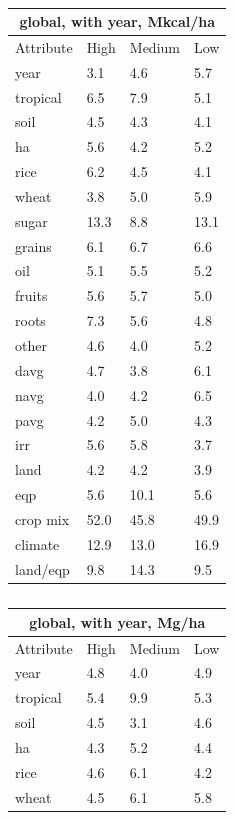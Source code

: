 \documentclass[11pt]{article}
\begin{document}
\begin{table}[h!]
\parbox{.45\linewidth} {
\centering
\begin{tabular}{llll}
\toprule
\multicolumn{4}{c}{\textbf{global, with year, Mkcal/ha}} \\
\midrule
Attribute & High & Medium & Low \\
\midrule
year & 3.1 & 4.6 & 5.7 \\
tropical & 6.5 & 7.9 & 5.1 \\
soil & 4.5 & 4.3 & 4.1 \\
ha & 5.6 & 4.2 & 5.2 \\
rice & 6.2 & 4.5 & 4.1 \\
wheat & 3.8 & 5.0 & 5.9 \\
sugar & 13.3 & 8.8 & 13.1 \\
grains & 6.1 & 6.7 & 6.6 \\
oil & 5.1 & 5.5 & 5.2 \\
fruits & 5.6 & 5.7 & 5.0 \\
roots & 7.3 & 5.6 & 4.8 \\
other & 4.6 & 4.0 & 5.2 \\
davg & 4.7 & 3.8 & 6.1 \\
navg & 4.0 & 4.2 & 6.5 \\
pavg & 4.2 & 5.0 & 4.3 \\
irr & 5.6 & 5.8 & 3.7 \\
land & 4.2 & 4.2 & 3.9 \\
eqp & 5.6 & 10.1 & 5.6 \\
\midrule
crop mix & 52.0 & 45.8 & 49.9 \\
climate & 12.9 & 13.0 & 16.9 \\
land/eqp & 9.8 & 14.3 & 9.5 \\
\bottomrule
\end{tabular}
\caption{ }
\label{k.wy.wt_percentages}
}
\parbox{.45\linewidth} {
\centering
\begin{tabular}{llll}
\toprule
\multicolumn{4}{c}{\textbf{global, with year, Mg/ha}} \\
\midrule
Attribute & High & Medium & Low \\
\midrule
year & 4.8 & 4.0 & 4.9 \\
tropical & 5.4 & 9.9 & 5.3 \\
soil & 4.5 & 3.1 & 4.6 \\
ha & 4.3 & 5.2 & 4.4 \\
rice & 4.6 & 6.1 & 4.2 \\
wheat & 4.5 & 6.1 & 5.8 \\

\end{tabular}}
\end{table}
\end{document}
